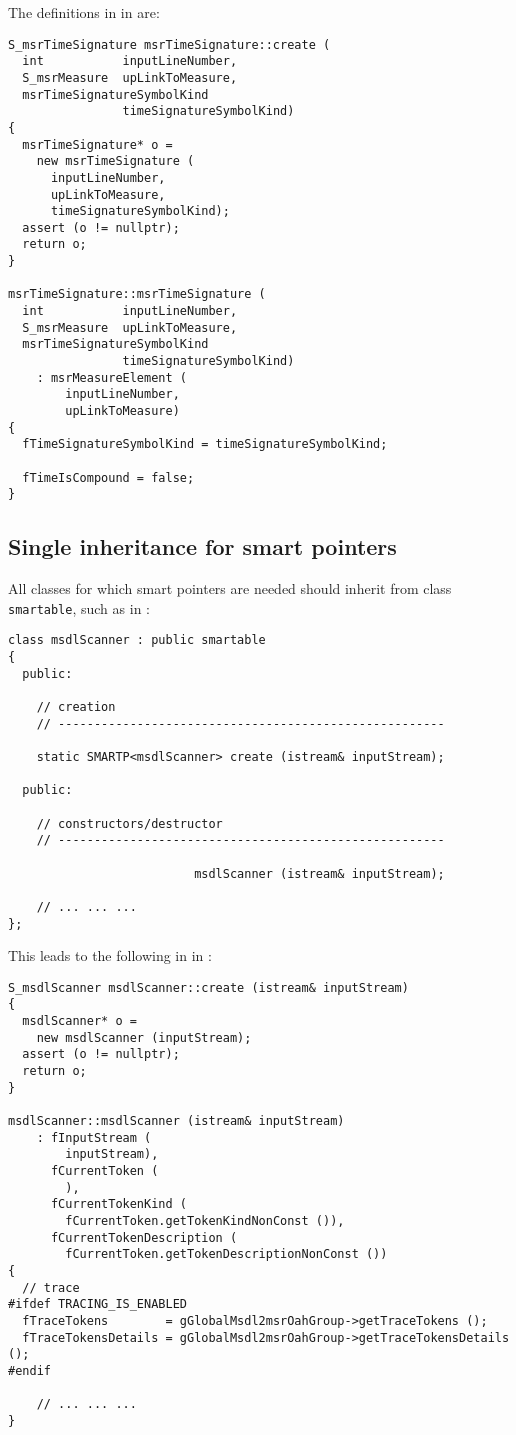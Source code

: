 The definitions in in  are:
\begin{lstlisting}[language=CPlusPlus]
S_msrTimeSignature msrTimeSignature::create (
  int           inputLineNumber,
  S_msrMeasure  upLinkToMeasure,
  msrTimeSignatureSymbolKind
                timeSignatureSymbolKind)
{
  msrTimeSignature* o =
    new msrTimeSignature (
      inputLineNumber,
      upLinkToMeasure,
      timeSignatureSymbolKind);
  assert (o != nullptr);
  return o;
}

msrTimeSignature::msrTimeSignature (
  int           inputLineNumber,
  S_msrMeasure  upLinkToMeasure,
  msrTimeSignatureSymbolKind
                timeSignatureSymbolKind)
    : msrMeasureElement (
        inputLineNumber,
        upLinkToMeasure)
{
  fTimeSignatureSymbolKind = timeSignatureSymbolKind;

  fTimeIsCompound = false;
}
\end{lstlisting}


\subsection{Single inheritance for smart pointers}

All classes for which smart pointers are needed should inherit from class {\tt smartable}, such as in :
\begin{lstlisting}[language=CPlusPlus]
class msdlScanner : public smartable
{
  public:

    // creation
    // ------------------------------------------------------

    static SMARTP<msdlScanner> create (istream& inputStream);

  public:

    // constructors/destructor
    // ------------------------------------------------------

                          msdlScanner (istream& inputStream);

	// ... ... ...
};
\end{lstlisting}

This leads to the following in in :
\begin{lstlisting}[language=CPlusPlus]
S_msdlScanner msdlScanner::create (istream& inputStream)
{
  msdlScanner* o =
    new msdlScanner (inputStream);
  assert (o != nullptr);
  return o;
}

msdlScanner::msdlScanner (istream& inputStream)
    : fInputStream (
        inputStream),
      fCurrentToken (
        ),
      fCurrentTokenKind (
        fCurrentToken.getTokenKindNonConst ()),
      fCurrentTokenDescription (
        fCurrentToken.getTokenDescriptionNonConst ())
{
  // trace
#ifdef TRACING_IS_ENABLED
  fTraceTokens        = gGlobalMsdl2msrOahGroup->getTraceTokens ();
  fTraceTokensDetails = gGlobalMsdl2msrOahGroup->getTraceTokensDetails ();
#endif

	// ... ... ...
}
\end{lstlisting}


